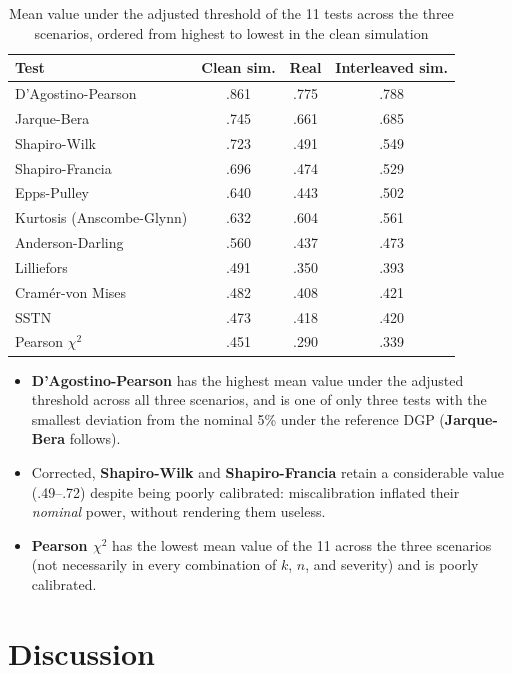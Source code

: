 \documentclass[man,mask,donotrepeattitle,floatsintext]{apa7}
\begin{document}
\begin{table}[H]
\small
\caption{Mean value under the adjusted threshold of the 11 tests across the three scenarios, ordered from highest to lowest in the clean simulation}
\label{tab:ranking}
\begin{tabular}{lccc}
\toprule
Test & Clean sim. & Real & Interleaved sim. \\
\midrule
D'Agostino-Pearson & .861 & .775 & .788 \\
Jarque-Bera & .745 & .661 & .685 \\
Shapiro-Wilk & .723 & .491 & .549 \\
Shapiro-Francia & .696 & .474 & .529 \\
Epps-Pulley & .640 & .443 & .502 \\
Kurtosis (Anscombe-Glynn) & .632 & .604 & .561 \\
Anderson-Darling & .560 & .437 & .473 \\
Lilliefors & .491 & .350 & .393 \\
Cramér-von Mises & .482 & .408 & .421 \\
SSTN & .473 & .418 & .420 \\
Pearson $\chi^2$ & .451 & .290 & .339 \\
\bottomrule
\end{tabular}
\end{table}

\begin{itemize}
\item \textbf{D'Agostino-Pearson} has the highest mean value under the adjusted threshold across all three scenarios, and is one of only three tests with the smallest deviation from the nominal 5\% under the reference DGP (\textbf{Jarque-Bera} follows).
\item Corrected, \textbf{Shapiro-Wilk} and \textbf{Shapiro-Francia} retain a considerable value (.49--.72) despite being poorly calibrated: miscalibration inflated their \emph{nominal} power, without rendering them useless.
\item \textbf{Pearson $\chi^2$} has the lowest mean value of the 11 across the three scenarios (not necessarily in every combination of $k$, $n$, and severity) and is poorly calibrated.
\end{itemize}

\section{Discussion}
\label{sec:discussion}
\end{document}
